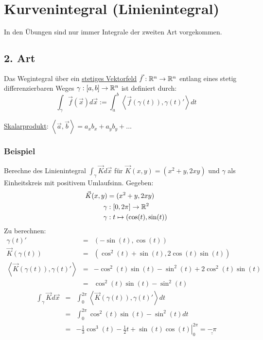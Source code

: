 \section{Kurvenintegral (Linienintegral)}
In den Übungen sind nur immer Integrale der zweiten Art vorgekommen. 

\subsection{2. Art}
Das Wegintegral über ein \underline{stetiges Vektorfeld} $\vec{f}: \mathbb{R}^n \to \mathbb{R}^n$
entlang eines stetig differenzierbaren Weges $\gamma: [a,b] \to \mathbb{R}^n$ ist definiert
durch:
\[
\int_\gamma \vec{f}(\vec{x}) d\vec{x} := \int_a^b \left< \vec{f}(\gamma(t)), \gamma(t)' \right> dt
\]

\underline{Skalarprodukt}: $\left< \vec{a}, \vec{b} \right> = a_x b_x + a_y b_y + \ldots$

\subsubsection{Beispiel}
Berechne des Linienintegral $\int_\gamma \vec{K} d\vec{x} $ für $ \vec{K}(x,y) = (x^2+y, 2xy)$ und $\gamma$ als Einheitskreis mit positivem Umlaufsinn.
Gegeben:
\begin{align*}
\vec{K}(x,y) &= (x^2+y, 2xy) \\
\gamma &: [0,2\pi]  \to \mathbb{R}^2\\
\gamma &: t \mapsto   (\cos(t), \sin(t)) 
\end{align*}
Zu berechnen:
\begin{eqnarray*}
\gamma(t)' &=& (-\sin(t),\cos(t))\\
\vec{K}(\gamma(t)) &=& (\cos^2(t) + \sin(t), 2 \cos(t)\sin(t))\\
\left< \vec{K}(\gamma(t)), \gamma(t)' \right> &=& -\cos^2(t)\sin(t) - \sin^2(t)
+ 2\cos^2(t)\sin(t)\\
 &=& \cos^2(t)\sin(t) - \sin^2(t)
\end{eqnarray*}
\begin{eqnarray*}
\int_\gamma \vec{K} d\vec{x} &=& \int_0^{2\pi} \left< \vec{K}(\gamma(t)), \gamma(t)' \right> dt\\
&=& \int_0^{2\pi} \cos^2(t)\sin(t) - \sin^2(t) dt\\
&=& \left. -\frac{1}{3}\cos^3(t) - \frac{1}{2}t + \sin(t)\cos(t)
\right|_0^{2\pi} = \underline{\underline{-\pi}}
\end{eqnarray*}


